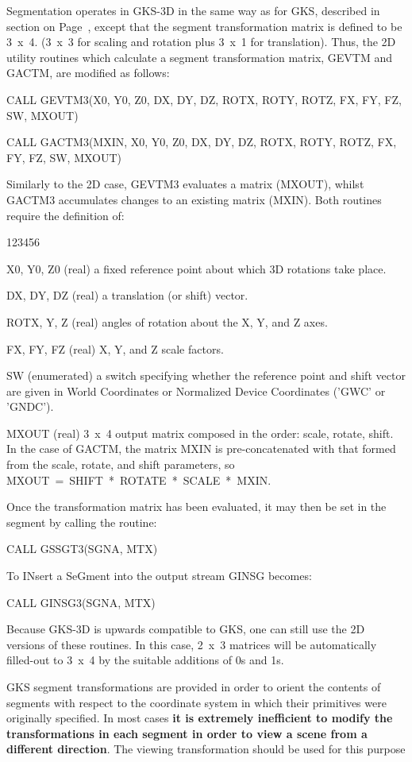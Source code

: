 Segmentation operates in GKS-3D in the same way as for GKS,
described in section on Page~\pageref{sec:segtfm}, except that the segment
transformation matrix is defined to be 3~x~4.
(3~x~3 for scaling and rotation plus 3~x~1 for
translation).
Thus, the 2D utility routines which calculate a segment
transformation matrix, GEVTM and GACTM, are modified as follows:
\begin{XMP}
CALL GEVTM3(X0, Y0, Z0, DX, DY, DZ,
              ROTX, ROTY, ROTZ, FX, FY, FZ, SW, MXOUT)
 
CALL GACTM3(MXIN, X0, Y0, Z0, DX, DY, DZ,
              ROTX, ROTY, ROTZ, FX, FY, FZ, SW, MXOUT)
\end{XMP}
Similarly to the 2D case, GEVTM3 evaluates a matrix (MXOUT),
whilst GACTM3 accumulates changes to an existing matrix (MXIN).
Both routines require the definition of:
\begin{DLtt}{123456}
\item[X0, Y0, Z0]
(real) a fixed reference point about which 3D rotations take place.
\item[DX, DY, DZ]
(real) a translation (or shift) vector.
\item[ROTX, Y, Z]
(real) angles of rotation about the X, Y, and Z axes.
\item[FX, FY, FZ]
(real) X, Y, and Z scale factors.
\item[SW]
(enumerated) a switch specifying whether the reference point and
shift vector are given in World Coordinates
or Normalized Device Coordinates ('GWC' or 'GNDC').
\item[MXOUT]
(real) 3~x~4 output matrix composed in the
order: scale, rotate, shift.
In the case of GACTM, the matrix MXIN is pre-concatenated with that
formed from the scale, rotate, and shift parameters, so
MXOUT~=~SHIFT~*~ROTATE~*~SCALE~*~MXIN.
\end{DLtt}
 
Once the transformation matrix has been evaluated, it may then be
set in the segment by calling the routine:
\begin{XMP}
CALL GSSGT3(SGNA, MTX)
\end{XMP}
To INsert a SeGment into the output stream GINSG becomes:
\begin{XMP}
CALL GINSG3(SGNA, MTX)
\end{XMP}
 
Because GKS-3D is upwards compatible to GKS, one can still use the
2D versions of these routines.
In this case, 2~x~3 matrices will be automatically filled-out
to 3~x~4 by the suitable additions of 0s and 1s.
\begin{note}
GKS segment transformations are provided in order to orient the
contents of segments with respect to the coordinate system in which
their primitives were originally specified. In most cases {\bf it is
extremely inefficient to modify the transformations in each segment
in order to view a scene from a different direction}. The viewing
transformation should be used for this purpose
\end{note}
